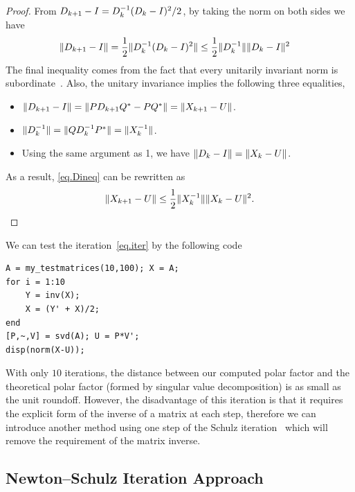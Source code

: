 \begin{proof}
    From $D_{k+1}-I = D_k^{-1} (D_k - I)^2/2$, by taking the norm on both sides we have 
    \begin{equation}\label{eq.Dineq}
        \begin{aligned}
            \|{D_{k+1}-I}\| &= \frac 12 \|{D_k^{-1} (D_k - I)^2}\| \leq \frac 12 \|{D_k^{-1}}\| \|{D_k - I}\|^2
        \end{aligned}
    \end{equation}
    The final inequality comes from the fact that every unitarily invariant norm is subordinate~. Also, the unitary invariance implies the following three equalities,
    \begin{itemize}
        \item $\|{D_{k+1}- I}\| = \|{PD_{k+1} Q^* - PQ^*}\| = \|{X_{k+1} - U}\|$. 
        \item $\|{D_k^{-1}}\| = \|{QD_k^{-1} P^*}\| =\|{X_k^{-1}}\|$.
        \item Using the same argument as 1, we have $\|{D_k - I}\| = \|{X_k - U}\|$.
    \end{itemize}
    As a result, \eqref{eq.Dineq} can be rewritten as 
    \begin{equation}\notag
        \|{X_{k+1} - U}\| \leq \frac 12 \|{X_k^{-1}}\|\|{X_k - U}\|^2.
    \end{equation}
\end{proof}

We can test the iteration~\eqref{eq.iter} by the following code 
\begin{lstlisting}
A = my_testmatrices(10,100); X = A;
for i = 1:10
    Y = inv(X);
    X = (Y' + X)/2;
end
[P,~,V] = svd(A); U = P*V'; 
disp(norm(X-U));
\end{lstlisting}
With only $10$ iterations, the distance between our computed polar factor and the theoretical polar factor (formed by singular value decomposition) is as small as the unit roundoff. However, the disadvantage of this iteration is that it requires the explicit form of the inverse of a matrix at each step, therefore we can introduce another method using one step of the Schulz iteration~ which will remove the requirement of the matrix inverse.

\subsection{Newton--Schulz Iteration Approach}

